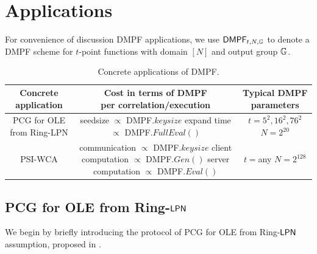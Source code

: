 \section{Applications}

For convenience of discussion DMPF applications, we use ${\sf DMPF}_{t, N, \mathbb{G}}$ to denote a DMPF scheme for $t$-point functions with domain $[N]$ and output group $\mathbb{G}$. 

\begin{table}
  \caption{Concrete applications of DMPF. }
  \label{tab:app_parameters}
	\begin{tabular}{ccc}
    \toprule
		Concrete application &\makecell{Cost in terms of DMPF\\per correlation/execution}& Typical DMPF parameters \\
    \midrule
		PCG for OLE from Ring-LPN &\makecell{seedsize $\propto$ DMPF.$keysize$\\expand time $\propto$ DMPF.$FullEval()$} & \makecell{$t = 5^2, 16^2, 76^2$\\$N = 2^{20}$}  \\
		PSI-WCA & \makecell{communication $\propto$ DMPF.$keysize$\\client computation $\propto$ DMPF.$Gen()$\\server computation $\propto$ DMPF.$Eval()$} & \makecell{$t = $any\\$N = 2^{128}$}\\
    \bottomrule
	\end{tabular}
\end{table}

\subsection{PCG for OLE from Ring-${\sf LPN}$}

We begin by briefly introducing the protocol of PCG for OLE from Ring-${\sf LPN}$ assumption, proposed in \cite{cryptoeprint:2022/1035}. 

